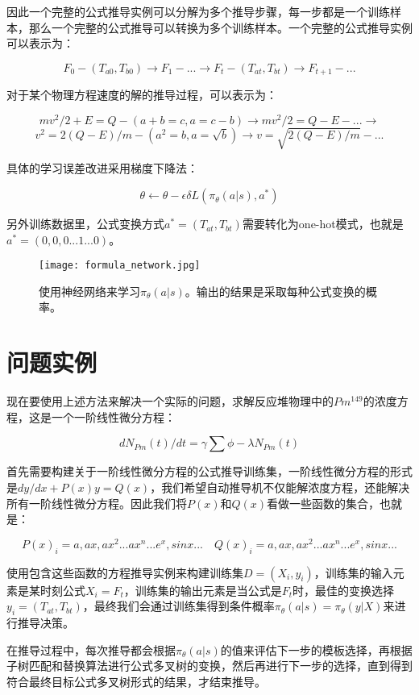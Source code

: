 \documentclass[runningheads]{llncs}
\begin{document}
因此一个完整的公式推导实例可以分解为多个推导步骤，每一步都是一个训练样本，那么一个完整的公式推导可以转换为多个训练样本。一个完整的公式推导实例可以表示为：

$$F_0 -(T_{a0},T_{b0})\to F_1 -...\to F_t -(T_{at},T_{bt})\to F_{t+1} -...$$

对于某个物理方程速度的解的推导过程，可以表示为：

$$mv^2/2+E=Q -(a+b=c,a=c-b)\to mv^2/2=Q-E -...\to $$
$$v^2=2(Q-E)/m -(a^2=b,a=\sqrt b)\to v=\sqrt{ 2(Q-E)/m}-...$$

具体的学习误差改进采用梯度下降法：

$$\theta \leftarrow \theta - \epsilon \delta L(\pi_{\theta}(a|s),a^*)$$

另外训练数据里，公式变换方式$a^*=(T_{at},T_{bt})$需要转化为one-hot模式，也就是$a^*=(0,0,0...1...0)$。

\begin{figure}[H]
\centering
\texttt{[image: formula\_network.jpg]}
\caption{使用神经网络来学习$\pi_{\theta}(a|s)$。输出的结果是采取每种公式变换的概率。}
\end{figure}












\section{问题实例}
现在要使用上述方法来解决一个实际的问题，求解反应堆物理中的$Pm^{149}$的浓度方程，这是一个一阶线性微分方程：

$$dN_{Pm}(t)/dt = \gamma \sum \phi - \lambda N_{Pm}(t) $$

首先需要构建关于一阶线性微分方程的公式推导训练集，一阶线性微分方程的形式是$dy/dx + P(x)y = Q(x) $，我们希望自动推导机不仅能解浓度方程，还能解决所有一阶线性微分方程。因此我们将$P(x) $和$Q(x) $看做一些函数的集合，也就是：

$${P(x)_i}={a,ax,ax^2...ax^n...e^x,sinx...} \quad {Q(x)_i}={a,ax,ax^2...ax^n...e^x,sinx...} $$

使用包含这些函数的方程推导实例来构建训练集$D={(X_i,y_i)}$，训练集的输入元素是某时刻公式$X_i=F_t$，训练集的输出元素是当公式是$F_t$时，最佳的变换选择$y_i=(T_{at},T_{bt})$，最终我们会通过训练集得到条件概率$\pi_{\theta}(a|s)=\pi_{\theta}(y|X)$来进行推导决策。

在推导过程中，每次推导都会根据$\pi_{\theta}(a|s)$的值来评估下一步的模板选择，再根据子树匹配和替换算法进行公式多叉树的变换，然后再进行下一步的选择，直到得到符合最终目标公式多叉树形式的结果，才结束推导。
\end{document}
